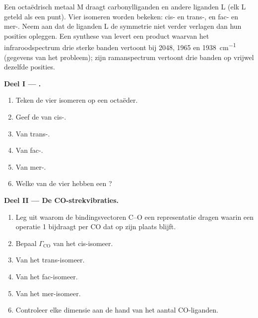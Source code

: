 \begin{problem}
\label{pb:b3:group-theory-applied:1}
Een octaëdrisch metaal M draagt carbonylliganden en andere liganden L (elk
L geteld als een punt). Vier isomeren worden bekeken: cis- en
trans-, en fac- en mer-. Neem aan dat de liganden L
de symmetrie niet verder verlagen dan hun posities opleggen. Een synthese
van
 levert een product waarvan het infraroodspectrum drie sterke
banden vertoont bij 2048, 1965 en \qty{1938}{cm^{-1}} (gegevens van het
probleem); zijn ramanspectrum vertoont drie banden op vrijwel dezelfde
posities.

\medskip\noindent\textbf{Deel I --- .}
\begin{enumerate}
  \item Teken de vier isomeren op een octaëder.
  \item Geef de  van cis-.
  \item Van trans-.
  \item Van fac-.
  \item Van mer-.
  \item Welke van de vier hebben een ?
\end{enumerate}

\medskip\noindent\textbf{Deel II --- De CO-strekvibraties.}
\begin{enumerate}[resume]
  \item Leg uit waarom de bindingsvectoren C--O een representatie dragen
        waarin een operatie 1 bijdraagt per CO dat op zijn plaats blijft.
  \item Bepaal $\Gamma_{\mathrm{CO}}$ van het cis-isomeer.
  \item Van het trans-isomeer.
  \item Van het fac-isomeer.
  \item Van het mer-isomeer.
  \item Controleer elke dimensie aan de hand van het aantal CO-liganden.
\end{enumerate}


\end{problem}
